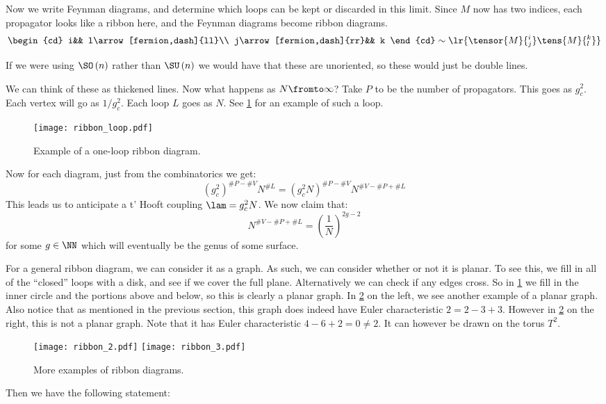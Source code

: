 \documentclass{booc}
\begin{document}
Now we write Feynman diagrams, and determine which loops can be kept or discarded in this limit.
Since $M$ now has two indices, each propagator looks like a ribbon here,
and the Feynman diagrams become ribbon diagrams.
\begin{equation}
\begin{cd}
i&&
l\arrow[fermion,dash]{ll}\\
j\arrow[fermion,dash]{rr}&&
k
\end{cd}\sim
\lr{
\tensor{M}{^i_j} \tens{M}{^k_l}
}
\end{equation}
\begin{rmk}
If we were using $\SO\left( n \right)$ rather than $\SU\left( n \right)$ we would have
that these are unoriented, so these would just be double lines. 
\end{rmk}
We can think of these as thickened lines.
Now what happens as $N\fromto \infty$?
Take $P$ to be the number of propagators. This goes as $g_c^2$.
Each vertex will go as $1 / g_c^2$. 
Each loop $L$ goes as $N$. See \cref{fig:ribbon_loop} for an example of such a loop.
\begin{figure}
\texttt{[image: ribbon\_loop.pdf]}
\caption{Example of a one-loop ribbon diagram.}
\label{fig:ribbon_loop}
\end{figure}
Now for each diagram, just from the combinatorics we get:
\begin{equation}
\left( g_c^2 \right)^{\# P - \# V}N^{\# L} = \left( g_c^2 N \right)^{\# P - \# V}
N^{\# V - \# P + \# L}
\end{equation}
This leads us to anticipate a t' Hooft coupling
$\lam = g_c^2 N$. We now claim that:
\begin{equation}
N^{\# V - \# P + \# L}
= \left( \frac{1}{N} \right)^{2g - 2}
\end{equation}
for some $g\in \NN$ which will eventually be the genus of some surface.

For a general ribbon diagram, we can consider it as a graph. As such, we can
consider whether or not it is planar. 
To see this, we fill in all of the ``closed'' loops with a disk, and see if we cover 
the full plane. 
Alternatively we can check if any edges cross. 
So in \cref{fig:ribbon_loop} we fill in the inner circle
and the portions above and below, so this is clearly a planar graph.
In \cref{fig:ribbon_2} on the left, we see another example of a planar graph.
Also notice that as mentioned in the previous section, this graph does
indeed have Euler characteristic $2 = 2 - 3 + 3$.
However in \cref{fig:ribbon_2} on the right, this is not a planar graph. Note that
it has Euler characteristic $4 - 6 + 2 = 0\neq 2$. 
It can however be drawn on the torus $T^2$.
\begin{figure}
\centering
\texttt{[image: ribbon\_2.pdf]}
\texttt{[image: ribbon\_3.pdf]}
\caption{More examples of ribbon diagrams.}
\label{fig:ribbon_2}
\end{figure}
Then we have the following statement:
\end{document}
